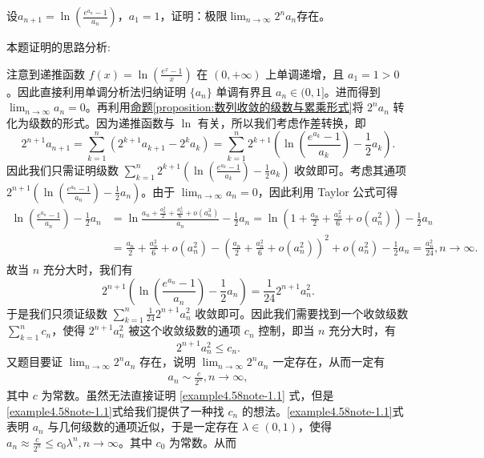 \documentclass[../../main.tex]{subfiles}
\begin{document}
\begin{example}
设\(a_{n + 1}=\ln\left(\frac{e^{a_n}-1}{a_n}\right)\)，\(a_1 = 1\)，证明：极限\(\lim_{n\rightarrow\infty}2^na_n\)存在。
\end{example}
\begin{note}
本题证明的思路分析:

注意到递推函数 \(f(x)=\ln\left(\frac{e^x - 1}{x}\right)\) 在 \((0, +\infty)\) 上单调递增，且 \(a_1 = 1>0\)。因此直接利用单调分析法归纳证明 \(\{ a_n \}\) 单调有界且 \(a_n\in(0, 1]\)。进而得到 \(\lim_{n \to \infty} a_n = 0\)。再利用\hyperref[proposition:数列收敛的级数与累乘形式]{命题\ref{proposition:数列收敛的级数与累乘形式}}将 \(2^n a_n\) 转化为级数的形式。因为递推函数与 \(\ln\) 有关，所以我们考虑作差转换，即
\[
2^{n + 1} a_{n + 1} = \sum_{k = 1}^n (2^{k + 1} a_{k + 1} - 2^k a_k) = \sum_{k = 1}^n 2^{k + 1}\left(\ln\left(\frac{e^{a_k} - 1}{a_k}\right) - \frac{1}{2} a_k\right).
\]
因此我们只需证明级数 \(\sum_{k = 1}^n 2^{k + 1}\left(\ln\left(\frac{e^{a_k} - 1}{a_k}\right) - \frac{1}{2} a_k\right)\) 收敛即可。考虑其通项 \(2^{n + 1}\left(\ln\left(\frac{e^{a_n} - 1}{a_n}\right) - \frac{1}{2} a_n\right)\)。由于 \(\lim_{n \to \infty} a_n = 0\)，因此利用 Taylor 公式可得
\begin{align*}
\ln\left(\frac{e^{a_n} - 1}{a_n}\right) - \frac{1}{2} a_n &= \ln\frac{a_n+\frac{a_n^2}{2}+\frac{a_n^3}{6}+o(a_n^3)}{a_n} - \frac{1}{2} a_n
= \ln\left(1 + \frac{a_n}{2}+\frac{a_n^2}{6}+o(a_n^2)\right) - \frac{1}{2} a_n\\
&= \frac{a_n}{2}+\frac{a_n^2}{6}+o(a_n^2) - \left(\frac{a_n}{2}+\frac{a_n^2}{6}+o(a_n^2)\right)^2 + o(a_n^2) - \frac{1}{2} a_n
= \frac{a_n^2}{24}, n \to \infty.
\end{align*}
故当 \(n\) 充分大时，我们有
\[
2^{n + 1}\left(\ln\left(\frac{e^{a_n} - 1}{a_n}\right) - \frac{1}{2} a_n\right) = \frac{1}{24} 2^{n + 1} a_n^2.
\]
于是我们只须证级数 \(\sum_{k = 1}^n \frac{1}{24} 2^{n + 1} a_n^2\) 收敛即可。因此我们需要找到一个收敛级数 \(\sum_{k = 1}^n c_n\)，使得 \(2^{n + 1} a_n^2\) 被这个收敛级数的通项 \(c_n\) 控制，即当 \(n\) 充分大时，有
\[
2^{n + 1} a_n^2 \leq c_n.
\]
又题目要证 \(\lim_{n \to \infty} 2^n a_n\) 存在，说明 \(\lim_{n \to \infty} 2^n a_n\) 一定存在，从而一定有
\begin{align}
a_n \sim \frac{c}{2^n}, n \to \infty, \label{example4.58note-1.1}
\end{align}
其中 \(c\) 为常数。虽然无法直接证明 \eqref{example4.58note-1.1} 式，但是 \eqref{example4.58note-1.1}式给我们提供了一种找 \(c_n\) 的想法。\eqref{example4.58note-1.1}式表明 \(a_n\) 与几何级数的通项近似，于是一定存在 \(\lambda \in (0, 1)\)，使得 \(a_n \approx \frac{c}{2^n} \leq c_0 \lambda ^n, n \to \infty\)。其中 \(c_0\) 为常数。从而

\end{note}
\end{document}

